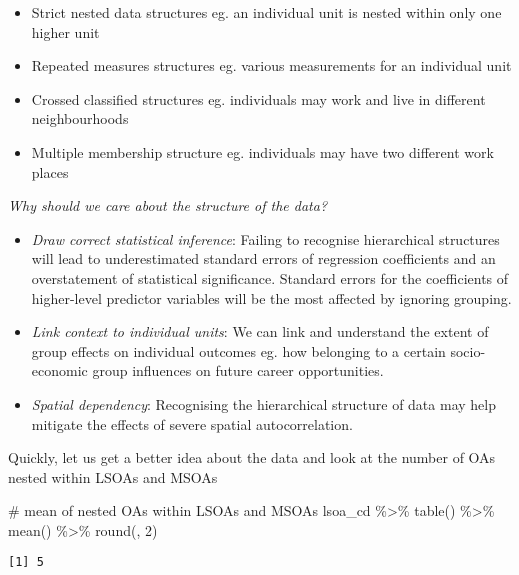\documentclass[
  letterpaper,
  krantz2]{style/krantz}
\newenvironment{Shaded}{\begin{snugshade}}{\end{snugshade}}
\newcommand{\CommentTok}[1]{\textcolor[rgb]{0.37,0.37,0.37}{#1}}
\newcommand{\DecValTok}[1]{\textcolor[rgb]{0.68,0.00,0.00}{#1}}
\newcommand{\FunctionTok}[1]{\textcolor[rgb]{0.28,0.35,0.67}{#1}}
\newcommand{\NormalTok}[1]{\textcolor[rgb]{0.00,0.23,0.31}{#1}}
\newcommand{\SpecialCharTok}[1]{\textcolor[rgb]{0.37,0.37,0.37}{#1}}
\begin{document}
\begin{itemize}
\item
  Strict nested data structures eg. an individual unit is nested within
  only one higher unit
\item
  Repeated measures structures eg. various measurements for an
  individual unit
\item
  Crossed classified structures eg. individuals may work and live in
  different neighbourhoods
\item
  Multiple membership structure eg. individuals may have two different
  work places
\end{itemize}

\emph{Why should we care about the structure of the data?}

\begin{itemize}
\item
  \emph{Draw correct statistical inference}: Failing to recognise
  hierarchical structures will lead to underestimated standard errors of
  regression coefficients and an overstatement of statistical
  significance. Standard errors for the coefficients of higher-level
  predictor variables will be the most affected by ignoring grouping.
\item
  \emph{Link context to individual units}: We can link and understand
  the extent of group effects on individual outcomes eg. how belonging
  to a certain socio-economic group influences on future career
  opportunities.
\item
  \emph{Spatial dependency}: Recognising the hierarchical structure of
  data may help mitigate the effects of severe spatial autocorrelation.
\end{itemize}

Quickly, let us get a better idea about the data and look at the number
of OAs nested within LSOAs and MSOAs

\begin{Shaded}
\begin{Highlighting}[]
\CommentTok{\# mean of nested OAs within LSOAs and MSOAs}
\NormalTok{lsoa\_cd }\SpecialCharTok{\%\textgreater{}\%} \FunctionTok{table}\NormalTok{() }\SpecialCharTok{\%\textgreater{}\%}
  \FunctionTok{mean}\NormalTok{() }\SpecialCharTok{\%\textgreater{}\%}
  \FunctionTok{round}\NormalTok{(, }\DecValTok{2}\NormalTok{)}
\end{Highlighting}
\end{Shaded}

\begin{verbatim}
[1] 5
\end{verbatim}
\end{document}
